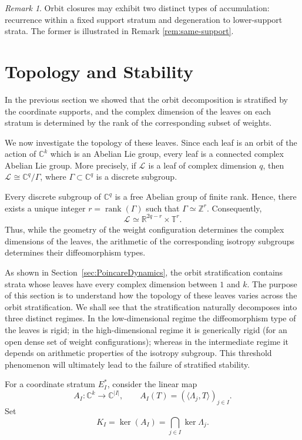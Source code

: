 \documentclass[11pt]{amsart}
\theoremstyle{definition}
\theoremstyle{remark}
\newtheorem{remark}[theorem]{Remark}
\newcommand{\Z}{\mathbb{Z}}
\newcommand{\C}{\mathbb{C}}
\newcommand{\R}{\mathbb{R}}
\newcommand{\T}{\mathbb{T}}
\newcommand{\leaf}[1]{\mathcal{L}_{#1}}
\newcommand{\stratSS}[1]{E_{#1}^*}
\newcommand{\stratS}[1]{\stratSS{#1}}
\begin{document}
\begin{remark}
	Orbit closures may exhibit two distinct types of accumulation: recurrence within a fixed support stratum and degeneration to lower-support strata.
	The former is illustrated in Remark \ref{rem:same-support}.
\end{remark}

\section{Topology and Stability}\label{sec:stability}

In the previous section we showed that the orbit decomposition is stratified by the coordinate supports, and the complex dimension of the leaves on each stratum is determined by the rank of the corresponding subset of weights.

We now investigate the topology of these leaves.
Since each leaf is an orbit of the action of $\C^k$ which is an Abelian Lie group, every leaf is a connected complex Abelian Lie group.
More precisely, if $\leaf{}$ is a leaf of complex dimension $q$, then $\leaf{}\cong\C^q/\Gamma$, where $\Gamma\subset\C^q$ is a discrete subgroup.

Every discrete subgroup of $\C^q$ is a free Abelian group of finite rank.
Hence, there exists a unique integer $r=\operatorname{rank}(\Gamma)$ such that $ \Gamma\simeq\Z^r$.
Consequently,
$$
	\leaf{}\simeq\R^{2q-r}\times\T^r.
$$
Thus, while the geometry of the weight configuration determines the complex dimensions of the leaves, the arithmetic of the corresponding isotropy subgroups determines their diffeomorphism types.

\medskip
As shown in Section~\ref{sec:PoincareDynamics}, the orbit stratification contains strata whose leaves have every complex dimension between $1$ and $k$.
The purpose of this section is to understand how the topology of these leaves varies across the orbit stratification.
We shall see that the stratification naturally decomposes into three distinct regimes.
In the low-dimensional regime the diffeomorphism type of the leaves is rigid; in the high-dimensional regime it is generically rigid (for an open dense set of weight configurations); whereas in the intermediate regime it depends on arithmetic properties of the isotropy subgroup.
This threshold phenomenon will ultimately lead to the failure of stratified stability.

\medskip

For a coordinate stratum $\stratS{I}$, consider the linear map 
$$ 
	A_I:\C^k\longrightarrow\C^{|I|}, \qquad A_I(T)= (\langle\Lambda_j,T\rangle)_{j\in I}.
$$
Set
$$
	K_I=\ker(A_I) =	\bigcap_{j\in I}\ker\Lambda_j.
$$
\end{document}
